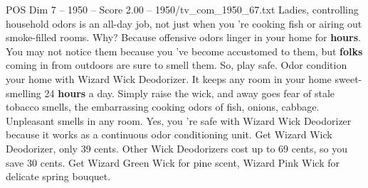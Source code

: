 \begin{textsample}{POS Dim 7 – 1950 – Score 2.00 – 1950/tv\_com\_1950\_67.txt}  \label{ex:f7_pos_011}
Ladies, controlling household odors is an all-day job, not just when you 're cooking fish or airing out smoke-filled rooms.
Why?
Because offensive odors linger in your home for \textbf{hours}.
You may not notice them because you 've become accustomed to them, but \textbf{folks} coming in from outdoors are sure to smell them.
So, play safe.
Odor condition your home with Wizard Wick Deodorizer.
It keeps any room in your home sweet-smelling 24 \textbf{hours} a day.
Simply raise the wick, and away goes fear of stale tobacco smells, the embarrassing cooking odors of fish, onions, cabbage.
Unpleasant smells in any room.
Yes, you 're safe with Wizard Wick Deodorizer because it works as a continuous odor conditioning unit.
Get Wizard Wick Deodorizer, only 39 cents.
Other Wick Deodorizers cost up to 69 cents, so you save 30 cents.
Get Wizard Green Wick for pine scent, Wizard Pink Wick for delicate spring bouquet.

\end{textsample}
